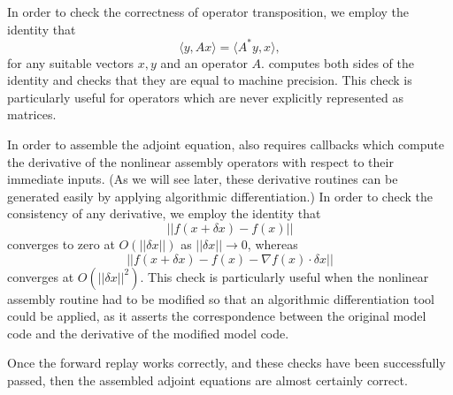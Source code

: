 In order to 
check the correctness of operator transposition, we employ the identity
that
\begin{equation*}
\langle y, Ax \rangle = \langle A^* y, x \rangle,
\end{equation*}
for any suitable vectors $x, y$ and an operator $A$. \libadjoint computes both
sides of the identity and checks that they are equal to machine precision. This
check is particularly useful for operators which are never explicitly
represented as matrices.

In order to assemble the adjoint equation, \libadjoint also requires
callbacks which compute the derivative of the nonlinear assembly operators
with respect to their immediate inputs. (As we will see later, these
derivative routines can be generated easily by applying algorithmic
differentiation.) In order to check the consistency of any derivative,
we employ the identity that
\begin{equation*}
\left|\left| f(x + \delta x) - f(x) \right|\right|
\end{equation*}
converges to zero at $O(\left|\left| \delta x \right|\right|)$ as $\left|\left|\delta x\right|\right| \rightarrow 0$, whereas
\begin{equation*}
\left|\left| f(x + \delta x) - f(x) - \nabla f(x)\cdot \delta x\right|\right|
\end{equation*}
converges at $O(\left|\left| \delta x \right|\right|^2)$. This check is
particularly useful when the nonlinear assembly routine had to be
modified so that an algorithmic differentiation tool could be applied,
as it asserts the correspondence between the original model code
and the derivative of the modified model code.

Once the forward replay works correctly, and these checks have been
successfully passed, then the assembled adjoint equations are almost certainly correct.

